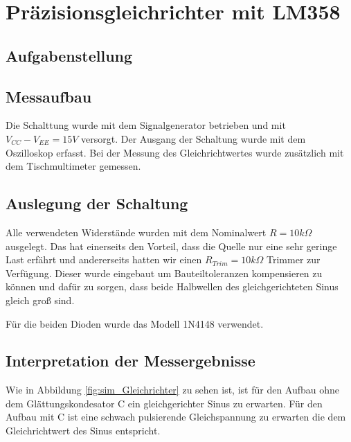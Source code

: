 \section{Präzisionsgleichrichter mit LM358}
\subsection{Aufgabenstellung}

\subsection{Messaufbau}
Die Schalttung wurde mit dem Signalgenerator betrieben und mit $V_{CC}  -V_{EE} = 15V$ versorgt. Der Ausgang der Schaltung wurde mit dem Oszilloskop erfasst. Bei der Messung des Gleichrichtwertes wurde zusätzlich mit dem Tischmultimeter gemessen.
\subsection{Auslegung der Schaltung}
Alle verwendeten Widerstände wurden mit dem Nominalwert $R=10k\Omega$ ausgelegt. Das hat einerseits den Vorteil, dass die Quelle nur eine sehr geringe Last erfährt und andererseits hatten wir einen $R_{Trim} = 10k\Omega$ Trimmer zur Verfügung. Dieser wurde eingebaut um Bauteiltoleranzen kompensieren zu können und dafür zu sorgen, dass beide Halbwellen des gleichgerichteten Sinus gleich groß sind.

Für die beiden Dioden wurde das Modell 1N4148 verwendet.
\subsection{Interpretation der Messergebnisse}
Wie in Abbildung \ref{fig:sim_Gleichrichter} zu sehen ist, ist für den Aufbau ohne dem Glättungskondesator C ein gleichgerichter Sinus zu erwarten. Für den Aufbau mit C ist eine schwach pulsierende Gleichspannung zu erwarten die dem Gleichrichtwert des Sinus entspricht.

